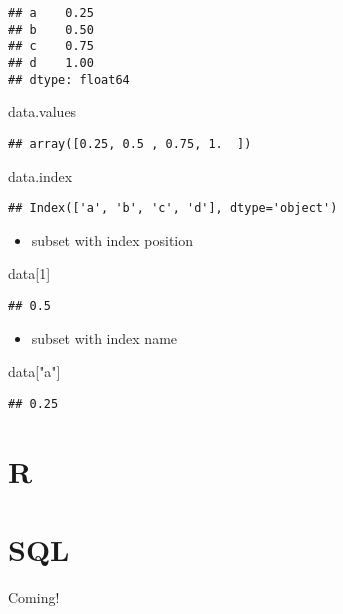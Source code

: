 \documentclass[
]{book}
\newenvironment{Shaded}{\begin{snugshade}}{\end{snugshade}}
\newcommand{\DecValTok}[1]{\textcolor[rgb]{0.00,0.00,0.81}{#1}}
\newcommand{\NormalTok}[1]{#1}
\newcommand{\StringTok}[1]{\textcolor[rgb]{0.31,0.60,0.02}{#1}}
\providecommand{\tightlist}{%
  \setlength{\itemsep}{0pt}\setlength{\parskip}{0pt}}
\begin{document}
\begin{verbatim}
## a    0.25
## b    0.50
## c    0.75
## d    1.00
## dtype: float64
\end{verbatim}

\begin{Shaded}
\begin{Highlighting}[]
\NormalTok{data.values}
\end{Highlighting}
\end{Shaded}

\begin{verbatim}
## array([0.25, 0.5 , 0.75, 1.  ])
\end{verbatim}

\begin{Shaded}
\begin{Highlighting}[]
\NormalTok{data.index}
\end{Highlighting}
\end{Shaded}

\begin{verbatim}
## Index(['a', 'b', 'c', 'd'], dtype='object')
\end{verbatim}

\begin{itemize}
\tightlist
\item
  subset with index position
\end{itemize}

\begin{Shaded}
\begin{Highlighting}[]
\NormalTok{data[}\DecValTok{1}\NormalTok{]}
\end{Highlighting}
\end{Shaded}

\begin{verbatim}
## 0.5
\end{verbatim}

\begin{itemize}
\tightlist
\item
  subset with index name
\end{itemize}

\begin{Shaded}
\begin{Highlighting}[]
\NormalTok{data[}\StringTok{"a"}\NormalTok{]}
\end{Highlighting}
\end{Shaded}

\begin{verbatim}
## 0.25
\end{verbatim}

\hypertarget{r}{%
\chapter{R}\label{r}}

\hypertarget{sql}{%
\chapter{SQL}\label{sql}}

Coming!

  
\end{document}

